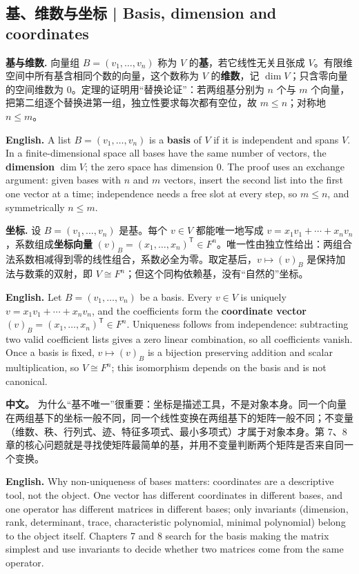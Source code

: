 \documentclass[UTF8,11pt,a4paper]{ctexart}
\newcommand{\EN}[1]{\par\noindent\textbf{English.} #1\par}
\newcommand{\APS}[2]{\par\noindent\textbf{中文。} #1\par\noindent\textbf{English.} #2\par\smallskip}
\begin{document}
\subsection{基、维数与坐标 | Basis, dimension and coordinates}
\noindent\textbf{基与维数.} 向量组 $B=(v_1,\dots,v_n)$ 称为 $V$ 的\textbf{基}，若它线性无关且张成 $V$。有限维空间中所有基含相同个数的向量，这个数称为 $V$ 的\textbf{维数}，记 $\dim V$；只含零向量的空间维数为 $0$。定理的证明用“替换论证”：若两组基分别为 $n$ 个与 $m$ 个向量，把第二组逐个替换进第一组，独立性要求每次都有空位，故 $m\le n$；对称地 $n\le m$。
\EN{A list $B=(v_1,\dots,v_n)$ is a \textbf{basis} of $V$ if it is independent and spans $V$. In a finite-dimensional space all bases have the same number of vectors, the \textbf{dimension} $\dim V$; the zero space has dimension $0$. The proof uses an exchange argument: given bases with $n$ and $m$ vectors, insert the second list into the first one vector at a time; independence needs a free slot at every step, so $m\le n$, and symmetrically $n\le m$.}
\noindent\textbf{坐标.} 设 $B=(v_1,\dots,v_n)$ 是基。每个 $v\in V$ 都能唯一地写成 $v=x_1v_1+\cdots+x_nv_n$，系数组成\textbf{坐标向量} $(v)_B=(x_1,\dots,x_n)^{\mathsf T}\in F^n$。唯一性由独立性给出：两组合法系数相减得到零的线性组合，系数必全为零。取定基后，$v\mapsto (v)_B$ 是保持加法与数乘的双射，即 $V\cong F^n$；但这个同构依赖基，没有“自然的”坐标。
\EN{Let $B=(v_1,\dots,v_n)$ be a basis. Every $v\in V$ is uniquely $v=x_1v_1+\cdots+x_nv_n$, and the coefficients form the \textbf{coordinate vector} $(v)_B=(x_1,\dots,x_n)^{\mathsf T}\in F^n$. Uniqueness follows from independence: subtracting two valid coefficient lists gives a zero linear combination, so all coefficients vanish. Once a basis is fixed, $v\mapsto (v)_B$ is a bijection preserving addition and scalar multiplication, so $V\cong F^n$; this isomorphism depends on the basis and is not canonical.}
\APS{为什么“基不唯一”很重要：坐标是描述工具，不是对象本身。同一个向量在两组基下的坐标一般不同，同一个线性变换在两组基下的矩阵一般不同；不变量（维数、秩、行列式、迹、特征多项式、最小多项式）才属于对象本身。第 7、8 章的核心问题就是寻找使矩阵最简单的基，并用不变量判断两个矩阵是否来自同一个变换。}{Why non-uniqueness of bases matters: coordinates are a descriptive tool, not the object. One vector has different coordinates in different bases, and one operator has different matrices in different bases; only invariants (dimension, rank, determinant, trace, characteristic polynomial, minimal polynomial) belong to the object itself. Chapters 7 and 8 search for the basis making the matrix simplest and use invariants to decide whether two matrices come from the same operator.}
\end{document}
